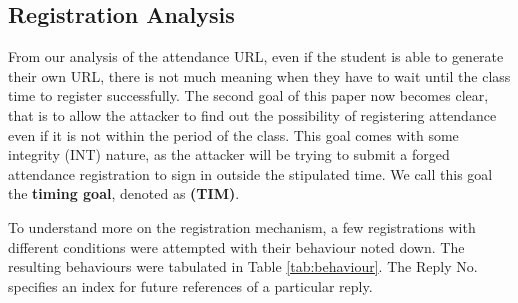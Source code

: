 \documentclass[runningheads]{llncs}
\begin{document}
\subsection{Registration Analysis}

From our analysis of the attendance URL, even if the student is able to generate their own URL, there is not much meaning when they have to wait until the class time to register successfully. The second goal of this paper now becomes clear, that is to allow the attacker to find out the possibility of registering attendance even if it is not within the period of the class. This goal comes with some integrity (INT) nature, as the attacker will be trying to submit a forged attendance registration to sign in outside the stipulated time. We call this goal the \textbf{timing goal}, denoted as \textbf{(TIM)}.

To understand more on the registration mechanism, a few registrations with different conditions were attempted with their behaviour noted down. The resulting behaviours were tabulated in Table \ref{tab:behaviour}. The Reply No. specifies an index for future references of a particular reply.
\end{document}
